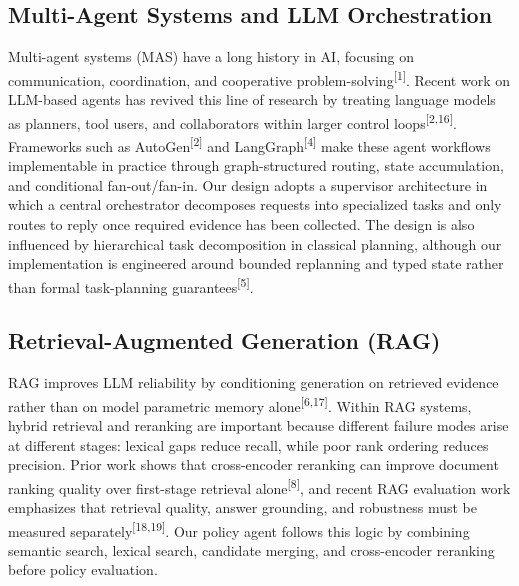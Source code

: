 \documentclass[11pt]{article}
\begin{document}
\subsection{Multi-Agent Systems and LLM Orchestration}
Multi-agent systems (MAS) have a long history in AI, focusing on communication, coordination, and cooperative problem-solving\textsuperscript{[1]}. Recent work on LLM-based agents has revived this line of research by treating language models as planners, tool users, and collaborators within larger control loops\textsuperscript{[2,16]}. Frameworks such as AutoGen\textsuperscript{[2]} and LangGraph\textsuperscript{[4]} make these agent workflows implementable in practice through graph-structured routing, state accumulation, and conditional fan-out/fan-in. Our design adopts a supervisor architecture in which a central orchestrator decomposes requests into specialized tasks and only routes to reply once required evidence has been collected. The design is also influenced by hierarchical task decomposition in classical planning, although our implementation is engineered around bounded replanning and typed state rather than formal task-planning guarantees\textsuperscript{[5]}.

\subsection{Retrieval-Augmented Generation (RAG)}
RAG improves LLM reliability by conditioning generation on retrieved evidence rather than on model parametric memory alone\textsuperscript{[6,17]}. Within RAG systems, hybrid retrieval and reranking are important because different failure modes arise at different stages: lexical gaps reduce recall, while poor rank ordering reduces precision. Prior work shows that cross-encoder reranking can improve document ranking quality over first-stage retrieval alone\textsuperscript{[8]}, and recent RAG evaluation work emphasizes that retrieval quality, answer grounding, and robustness must be measured separately\textsuperscript{[18,19]}. Our policy agent follows this logic by combining semantic search, lexical search, candidate merging, and cross-encoder reranking before policy evaluation.
\end{document}
